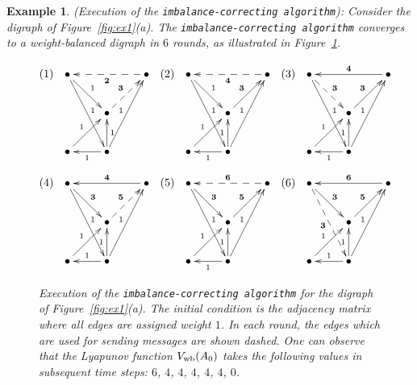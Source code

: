 \documentclass[final]{siamltex}
\newtheorem{example}[theorem]{Example}
\begin{document}
\begin{example}\label{ex:dis_digraph_ex}{\mbox{}\textup{({Execution of the
    {\texttt{imbalance-correcting algorithm}\xspace}}):}} {\rm Consider the digraph of
    Figure~\ref{fig:ex1}(a). The {\texttt{imbalance-correcting algorithm}\xspace} converges to a weight-balanced
    digraph in $ 6 $ rounds, as illustrated in
    Figure~\ref{fig:dis_digraph_ex_ev}.}
    
    
    
    {\relax\ifmmode\else\unskip\hfill\fi{\hbox{$\bullet$}}}
    \begin{figure}
      \[
      (1) \ \ \xymatrix{ \bullet \ar[dr]^1 \ar[ddr]^1 & & \bullet
        \ar@{-->}[ll]^{\textbf{2}} \\ 
      & \bullet \ar@{-->}[ur]^{\textbf{3}} &\\
      \bullet \ar[ur]^1 & \bullet \ar[u]_1 \ar[uur]^1 \ar[l]^1 & } 
      \ \ (2) \ \ 
    \xymatrix{ \bullet \ar[dr]^1 \ar[ddr]^1 & & \bullet \ar@{-->}[ll]^{\textbf{4}} \\
      & \bullet \ar[ur]^{\textbf{3}} &\\
      \bullet \ar[ur]^1 & \bullet \ar[u]^1 \ar[uur]^1 \ar[l]^1 & }
      \ \ (3) \ \ 
    \xymatrix{ \bullet \ar@{-->}[dr]^{\textbf{3}} \ar[ddr]^1 & & \bullet \ar[ll]_{\textbf{4}} \\
      & \bullet \ar[ur]^{\textbf{3}} &\\
      \bullet \ar[ur]^1 & \bullet \ar[u]^1 \ar[uur]^1 \ar[l]^1 & }
    \]
    \[
    (4) \ \
    \xymatrix{ \bullet \ar[dr]^{\textbf{3}} \ar[ddr]^1 & & \bullet \ar[ll]_{\textbf{4}} \\
      & \bullet \ar@{-->}[ur]^{\textbf{5}} &\\
      \bullet \ar[ur]^1 & \bullet \ar[u]^1 \ar[uur]^1 \ar[l]_1 & }
      \ \ (5) \ \ \xymatrix{ \bullet \ar[dr]^{\textbf{3}} \ar[ddr]^1 & & \bullet \ar@{-->}[ll]_{\textbf{6}} \\
      & \bullet \ar[ur]^{\textbf{5}} &\\
      \bullet \ar[ur]^1 & \bullet \ar[u]^1 \ar[uur]^1 \ar[l]^1 & } 
      \ \ (6) \ \
    \xymatrix{ \bullet \ar[dr]^{\textbf{3}} \ar@{-->}[ddr]_{\textbf{3}} & & \bullet \ar[ll]_{\textbf{6}} \\
      & \bullet \ar[ur]^{\textbf{5}} &\\
      \bullet \ar[ur]^1 & \bullet \ar[u]^1 \ar[uur]^1 \ar[l]_1 & }
    \]
    \caption{Execution of the {\texttt{imbalance-correcting algorithm}\xspace} for the digraph of
      Figure~\ref{fig:ex1}(a). The initial condition is the adjacency
      matrix where all edges are assigned weight $1$. In each round,
      the edges which are used for sending messages are shown
      dashed. One can observe that the Lyapunov function $
      {{V}_{\textup{{wb}}}}(A_0)$ takes the following values in subsequent
      time steps: $6$, $4$, $4$, $4$, $4$, $4$, $0$.}
    \label{fig:dis_digraph_ex_ev}
  \end{figure}
\end{example}
\end{document}
